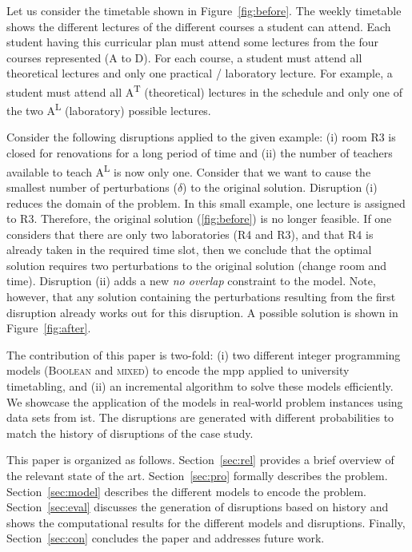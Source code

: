 \documentclass[twocolumn,natbib]{svjour3}          %
\newcounter{constraint}
\newcommand{\uni}{\gls{ist}}
\begin{document}
\begin{example}\label{ex:mov}
	Let us consider the timetable shown in Figure~\ref{fig:before}. The weekly timetable shows the different lectures of the different courses a student can attend. Each student having this curricular plan must attend some lectures from the four courses represented (A to D). For each course, a student must attend all theoretical lectures and only one practical / laboratory lecture. For example, a student must attend all A\textsuperscript{T} (theoretical) lectures in the schedule and only one of the two A\textsuperscript{L} (laboratory) possible lectures. 
	
	
	Consider the following disruptions applied to the given example: (i) room R3 is closed for renovations for a long period of time and (ii) the number of teachers available to teach A\textsuperscript{L} is now only one. Consider that we want to cause the smallest number of perturbations ($\delta$) to the original solution. Disruption (i) reduces the domain of the problem. In this small example, one lecture is assigned to R3. Therefore, the original solution (\ref{fig:before}) is no longer feasible. If one considers that there are only two laboratories (R4 and R3), and that R4 is already taken in the required time slot, then we conclude that the optimal solution requires two perturbations to the original solution (change room and time). Disruption (ii) adds a new {\em no overlap} constraint to the model. Note, however, that any solution containing the perturbations resulting from the first disruption already works out for this disruption. A possible solution is shown in Figure~\ref{fig:after}.
\end{example}


The contribution of this paper is two-fold: (i) two different integer programming models (\textsc{Boolean} and \textsc{mixed}) to encode the \gls{mpp} applied to university timetabling, and (ii) an incremental algorithm to solve these models efficiently.
We showcase the application of the models in real-world problem instances using data sets from \uni. The disruptions are generated with different probabilities to match the history of disruptions of the case study.

This paper is organized as follows. Section~\ref{sec:rel} provides a brief overview of the relevant state of the art. Section~\ref{sec:pro} formally describes the problem. Section~\ref{sec:model} describes the different models to encode the problem.  Section~\ref{sec:eval}  discusses the generation of disruptions based on history and shows the computational results for the different models and disruptions. Finally, Section~\ref{sec:con} concludes the paper and addresses future work.
\end{document}
